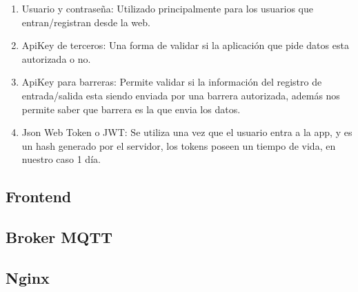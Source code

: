 \begin{enumerate}
    \item Usuario y contraseña: Utilizado principalmente para los usuarios que entran/registran desde la web.
    \item ApiKey de terceros: Una forma de validar si la aplicación que pide datos esta autorizada o no.
    \item ApiKey para barreras: Permite validar si la información del registro de entrada/salida esta siendo enviada por una barrera autorizada, además nos permite saber que barrera es la que envia los datos.
    \item Json Web Token o JWT: Se utiliza una vez que el usuario entra a la app, y es un hash generado por el servidor, los tokens poseen un tiempo de vida, en nuestro caso 1 día.
\end{enumerate}

\subsection{Frontend}

\subsection{Broker MQTT}



\subsection{Nginx}